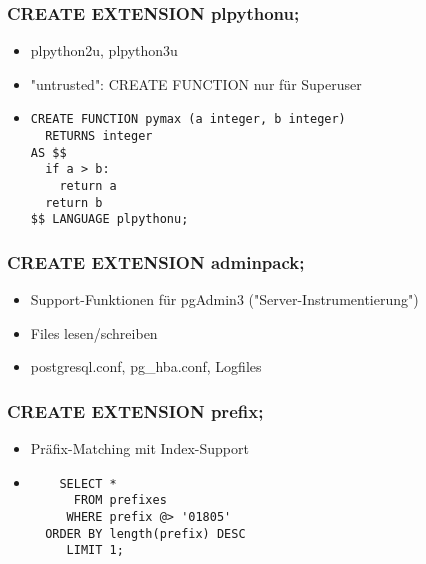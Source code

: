 \documentclass[utf8,hyperref={pdftex,colorlinks,linkcolor=black,citecolor=black,urlcolor=black,filecolor=black,plainpages=false},xcolor=table,hyperref]{beamer}
\begin{document}
\begin{frame}[containsverbatim]
	\frametitle{CREATE EXTENSION plpythonu;}
	\begin{itemize}
		\item plpython2u, plpython3u
		\item "{}untrusted": CREATE FUNCTION nur für Superuser
		\item
			\begin{verbatim}
CREATE FUNCTION pymax (a integer, b integer)
  RETURNS integer
AS $$
  if a > b:
    return a
  return b
$$ LANGUAGE plpythonu;
\end{verbatim}
	\end{itemize}
\end{frame}

\begin{frame}[containsverbatim]
	\frametitle{CREATE EXTENSION adminpack;}
	\begin{itemize}
		\item Support-Funktionen für pgAdmin3 ("{}Server-Instrumentierung")
		\item Files lesen/schreiben
		\item postgresql.conf, pg_hba.conf, Logfiles
	\end{itemize}
\end{frame}


\begin{frame}[containsverbatim]
	\frametitle{CREATE EXTENSION prefix;}
	\begin{itemize}
		\item Präfix-Matching mit Index-Support
		\item 
			\begin{verbatim}
    SELECT * 
      FROM prefixes
     WHERE prefix @> '01805'
  ORDER BY length(prefix) DESC
     LIMIT 1;
     \end{verbatim}
     \end{itemize}
\end{frame}
\end{document}
